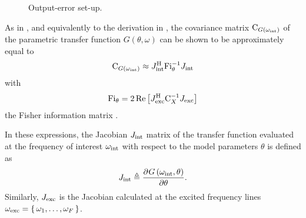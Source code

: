   \begin{figure}[h]
    \centering
    
    \caption[Output-error]{Output-error set-up.}
    \label{fig:excitation:OE}
  \end{figure}

  As in \citep{Pintelon2012, Gallager2008, matrixcookbook}, and equivalently to the derivation in , the covariance matrix $\mathrm{C}_{G\left(\omega_{\mathrm{int}}\right)}$ of the parametric transfer function $G(\theta,\omega)$ can be shown to be approximately equal to
  \begin{align}
    \C_{G\left( \omega_{\interest}\right) } \approx
      \InnerQuadraticForm[\HT]
                         {\jac{\interest}}
                         {\FisherInformation_{\theta}^{-1}}
     \label{eq:excitation:varPeak}
  \end{align}
  with 
  \begin{equation}
    \FisherInformation_{\theta} =
    2
    \real{
          \InnerQuadraticForm[\HT]
                              {\jac{\excited}}
                              {\C_{X}^{-1}}
          }
    \label{eq:excitation:FisherInfo}
  \end{equation}
  the Fisher information matrix \citep{Pintelon2012}.

  In these expressions, the Jacobian $J_{\mathrm{int}}$ matrix of the transfer function evaluated at the frequency of interest $\omega_{\mathrm{int}}$ with respect to the model parameters $\theta$ is defined as
  \begin{equation}
    J_{\mathrm{int}} \triangleq
         \frac{{\partial}^{} G\left( \omega_{\mathrm{int}}, \theta \right) }{\partial \theta}
    \text{.}
  \end{equation}
  Similarly, $J_{\mathrm{exc}}$ is the Jacobian calculated at the excited frequency lines $\omega_{\mathrm{exc}} = \set{\omega_1, \ldots, \omega_F}$.

